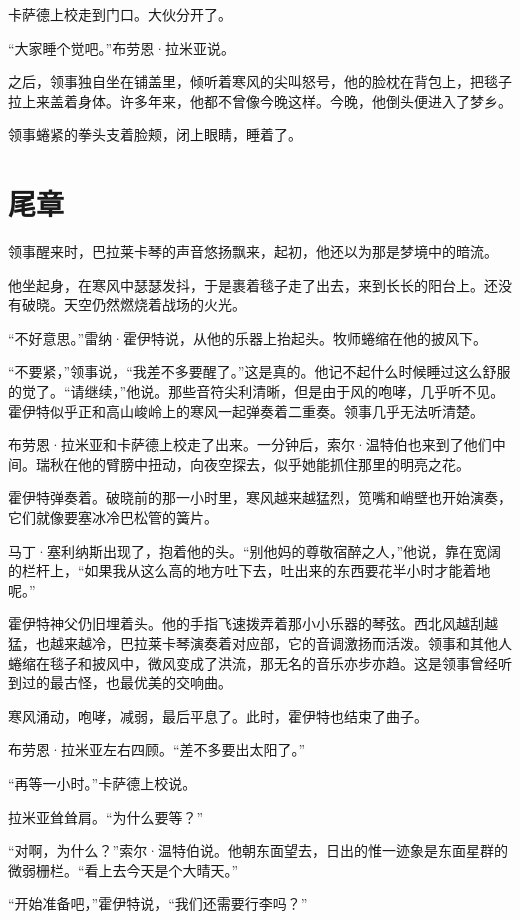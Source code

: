 \documentclass[AutoFakeBold=true]{book}
\begin{document}
卡萨德上校走到门口。大伙分开了。

``大家睡个觉吧。''布劳恩·拉米亚说。

之后，领事独自坐在铺盖里，倾听着寒风的尖叫怒号，他的脸枕在背包上，把毯子拉上来盖着身体。许多年来，他都不曾像今晚这样。今晚，他倒头便进入了梦乡。

领事蜷紧的拳头支着脸颊，闭上眼睛，睡着了。

\chapter{尾章}

领事醒来时，巴拉莱卡琴的声音悠扬飘来，起初，他还以为那是梦境中的暗流。

他坐起身，在寒风中瑟瑟发抖，于是裹着毯子走了出去，来到长长的阳台上。还没有破晓。天空仍然燃烧着战场的火光。

``不好意思。''雷纳·霍伊特说，从他的乐器上抬起头。牧师蜷缩在他的披风下。

``不要紧，''领事说，``我差不多要醒了。''这是真的。他记不起什么时候睡过这么舒服的觉了。``请继续，''他说。那些音符尖利清晰，但是由于风的咆哮，几乎听不见。霍伊特似乎正和高山峻岭上的寒风一起弹奏着二重奏。领事几乎无法听清楚。

布劳恩·拉米亚和卡萨德上校走了出来。一分钟后，索尔·温特伯也来到了他们中间。瑞秋在他的臂膀中扭动，向夜空探去，似乎她能抓住那里的明亮之花。

霍伊特弹奏着。破晓前的那一小时里，寒风越来越猛烈，笕嘴和峭壁也开始演奏，它们就像要塞冰冷巴松管的簧片。

马丁·塞利纳斯出现了，抱着他的头。``别他妈的尊敬宿醉之人，''他说，靠在宽阔的栏杆上，``如果我从这么高的地方吐下去，吐出来的东西要花半小时才能着地呢。''

霍伊特神父仍旧埋着头。他的手指飞速拨弄着那小小乐器的琴弦。西北风越刮越猛，也越来越冷，巴拉莱卡琴演奏着对应部，它的音调激扬而活泼。领事和其他人蜷缩在毯子和披风中，微风变成了洪流，那无名的音乐亦步亦趋。这是领事曾经听到过的最古怪，也最优美的交响曲。

寒风涌动，咆哮，减弱，最后平息了。此时，霍伊特也结束了曲子。

布劳恩·拉米亚左右四顾。``差不多要出太阳了。''

``再等一小时。''卡萨德上校说。

拉米亚耸耸肩。``为什么要等？''

``对啊，为什么？''索尔·温特伯说。他朝东面望去，日出的惟一迹象是东面星群的微弱栅栏。``看上去今天是个大晴天。''

``开始准备吧，''霍伊特说，``我们还需要行李吗？''
\end{document}

